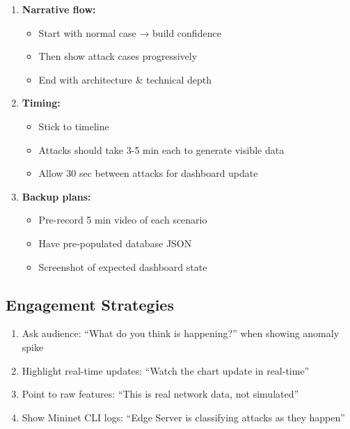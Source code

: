 \documentclass[12pt,a4paper]{article}
\begin{document}
\begin{enumerate}
    \item \textbf{Narrative flow:}
    \begin{itemize}
        \item Start with normal case → build confidence
        \item Then show attack cases progressively
        \item End with architecture \& technical depth
    \end{itemize}
    
    \item \textbf{Timing:}
    \begin{itemize}
        \item Stick to timeline
        \item Attacks should take 3-5 min each to generate visible data
        \item Allow 30 sec between attacks for dashboard update
    \end{itemize}
    
    \item \textbf{Backup plans:}
    \begin{itemize}
        \item Pre-record 5 min video of each scenario
        \item Have pre-populated database JSON
        \item Screenshot of expected dashboard state
    \end{itemize}
\end{enumerate}

\subsection{Engagement Strategies}

\begin{enumerate}
    \item Ask audience: ``What do you think is happening?'' when showing anomaly spike
    \item Highlight real-time updates: ``Watch the chart update in real-time''
    \item Point to raw features: ``This is real network data, not simulated''
    \item Show Mininet CLI logs: ``Edge Server is classifying attacks as they happen''
\end{enumerate}

\end{document}
